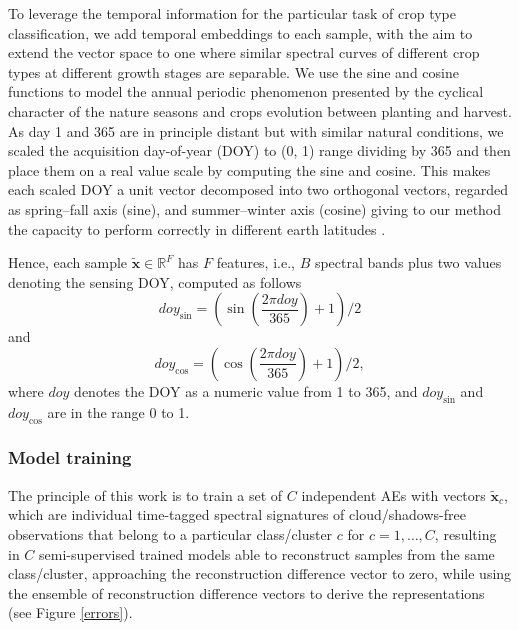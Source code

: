 \documentclass[journal,article,submit,pdftex,moreauthors]{Definitions/mdpi}
\begin{document}
To leverage the temporal information for the particular task of crop type classification, we add temporal embeddings to each sample, with the aim to extend the vector space to one where similar spectral curves of different crop types at different growth stages are separable. 
We use the sine and cosine functions to model the annual periodic phenomenon presented by the cyclical character of the nature seasons and crops evolution between planting and harvest. As day 1 and 365 are in principle distant but with similar natural conditions, we scaled the acquisition day-of-year (\ac{DOY}) to (0, 1) range dividing by 365 and then place them on a real value scale by computing the sine and cosine. This makes each scaled \ac{DOY} a unit vector decomposed into two orthogonal vectors, regarded as spring–fall axis (sine), and summer–winter axis (cosine) giving to our method the capacity to perform correctly in different earth latitudes \cite{Dahlin2016}.

Hence, each sample $\mathbf{\tilde{x}} \in \mathbb{R}^F$
has $F$ features, i.e., $B$ spectral bands plus two values denoting the sensing \ac{DOY}, computed as follows
\begin{equation}
	doy_{\sin} = \left(\sin\left(\frac{2\pi doy}{365}\right)+1\right)/2
\end{equation}
and
\begin{equation}
	doy_{\cos} = \left(\cos\left(\frac{2\pi doy}{365}\right)+1\right)/2, 
\end{equation}
where $doy$ denotes the \ac{DOY} as a numeric value from 1 to 365, and $doy_{\sin}$ and $doy_{\cos}$ are in the range 0 to 1.

\subsubsection{Model training}
The principle of this work is to train a set of $C$ independent AEs with vectors $\mathbf{\tilde{x}}_c$, which are individual time-tagged spectral signatures of cloud/shadows-free observations that belong to a particular class/cluster $c$ for $c=1,\dots,C$,  resulting in $C$ semi-supervised trained models able to reconstruct samples from the same class/cluster, approaching the reconstruction difference vector to zero, while using the ensemble of reconstruction difference vectors to derive the representations (see Figure \ref{errors}).
\end{document}
